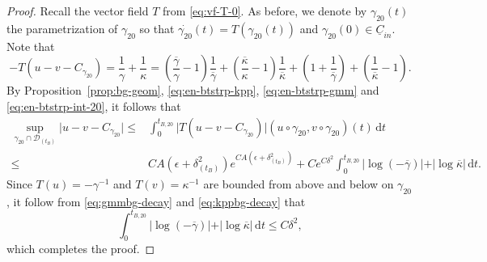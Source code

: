 \documentclass[10pt, reqno]{amsart}
\theoremstyle{definition}
\theoremstyle{remark}
\theoremstyle{conjecture}
\numberwithin{equation}{section}
\newcommand{\abs}[1]{\vert#1\vert}
\newcommand{\ud}{\mathrm{d}}
\newcommand{\0}{\emptyset}
\newcommand{\gmm}{\gamma}
\newcommand{\dlt}{\delta}
\newcommand{\eps}{\epsilon}
\newcommand{\kpp}{\kappa}
\newcommand{\lmb}{\lambda}
\newcommand{\calD}{\mathcal D}
\newcommand{\uC}{\underline{C}}
\newcommand{\dur}{\nu}
\newcommand{\dvr}{\lmb}
\newcommand{\kppbg}{\overline{\kpp}}					%
\newcommand{\gmmbg}{\overline{\gmm}}					%
\begin{document}
\begin{proof}
Recall the vector field $T$ from \eqref{eq:vf-T-0}. As before, we denote by $\gmm_{20}(t)$ the parametrization of $\gmm_{20}$ so that $\dot{\gmm_{20}}(t) = T(\gmm_{20}(t))$ and $\gmm_{20}(0) \in \uC_{in}$. Note that
\begin{equation*}
	- T(u - v - C_{\gmm_{20}}) = \frac{1}{\gmm} + \frac{1}{\kpp}
	= \left(\frac{\gmmbg}{\gmm} -1 \right) \frac{1}{\gmmbg} + \left(\frac{\kppbg}{\kpp} -1 \right) \frac{1}{\kppbg} + \left(1 + \frac{1}{\gmmbg}\right) + \left(\frac{1}{\kppbg} - 1\right).
\end{equation*}
By Proposition~\ref{prop:bg-geom}, \eqref{eq:en-btstrp-kpp}, \eqref{eq:en-btstrp-gmm} and \eqref{eq:en-btstrp-int-20}, it follows that
\begin{align*}
	\sup_{\gmm_{20} \cap \calD_{(t_{B})}} \abs{u - v - C_{\gmm_{20}}}
	\leq & \int_{0}^{t_{B, 20}} \abs{T (u - v - C_{\gmm_{20}})} (u \circ \gmm_{20}, v \circ \gmm_{20})(t) \, \ud t \\ 
	\leq & C A \left( \eps + \dlt_{(t_{B})}^{2} \right) e^{C A (\eps + \dlt_{(t_{B})}^{2})} + C e^{C \dlt^{2}} \int_{0}^{t_{B, 20}} \abs{\log (-\gmmbg)} + \abs{\log \kppbg} \, \ud t.
\end{align*}
Since $T(u) = - \gmm^{-1}$ and $T(v) = \kpp^{-1}$ are bounded from above and below on $\gmm_{20}$, it follow from \eqref{eq:gmmbg-decay} and \eqref{eq:kppbg-decay} that
\begin{equation*}
\int_{0}^{t_{B, 20}} \abs{\log (-\gmmbg)} + \abs{\log \kppbg} \, \ud t \leq C \dlt^{2},
\end{equation*}
which completes the proof. \qedhere
\end{proof}
\end{document}
